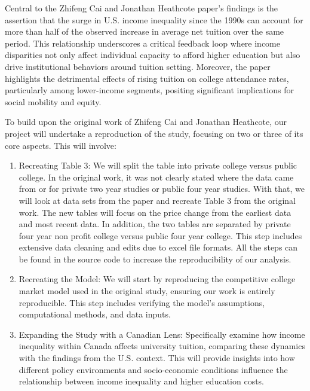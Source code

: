 \documentclass[
  letterpaper,
  DIV=11,
  numbers=noendperiod]{scrartcl}
\begin{document}
Central to the Zhifeng Cai and Jonathan Heathcote paper's findings is
the assertion that the surge in U.S. income inequality since the 1990s
can account for more than half of the observed increase in average net
tuition over the same period. This relationship underscores a critical
feedback loop where income disparities not only affect individual
capacity to afford higher education but also drive institutional
behaviors around tuition setting. Moreover, the paper highlights the
detrimental effects of rising tuition on college attendance rates,
particularly among lower-income segments, positing significant
implications for social mobility and equity.

To build upon the original work of Zhifeng Cai and Jonathan Heathcote,
our project will undertake a reproduction of the study, focusing on two
or three of its core aspects. This will involve:

\begin{enumerate}
\def\labelenumi{\arabic{enumi}.}
\item
  Recreating Table 3: We will split the table into private college
  versus public college. In the original work, it was not clearly stated
  where the data came from or for private two year studies or public
  four year studies. With that, we will look at data sets from the paper
  and recreate Table 3 from the original work. The new tables will focus
  on the price change from the earliest data and most recent data. In
  addition, the two tables are separated by private four year non profit
  college versus public four year college. This step includes extensive
  data cleaning and edits due to excel file formats. All the steps can
  be found in the source code to increase the reproducibility of our
  analysis.
\item
  Recreating the Model: We will start by reproducing the competitive
  college market model used in the original study, ensuring our work is
  entirely reproducible. This step includes verifying the model's
  assumptions, computational methods, and data inputs.
\item
  Expanding the Study with a Canadian Lens: Specifically examine how
  income inequality within Canada affects university tuition, comparing
  these dynamics with the findings from the U.S. context. This will
  provide insights into how different policy environments and
  socio-economic conditions influence the relationship between income
  inequality and higher education costs.
\end{enumerate}
\end{document}
